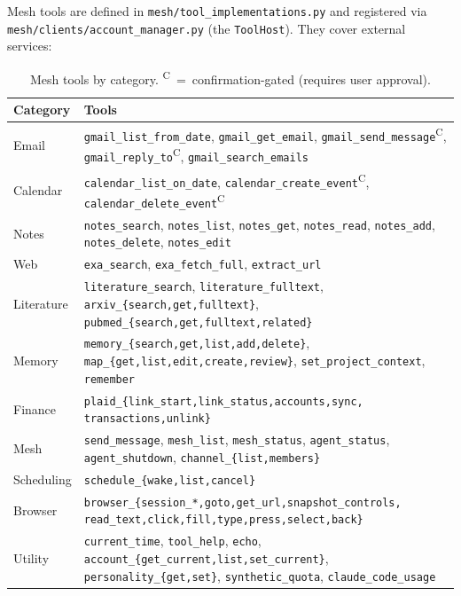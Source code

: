 \documentclass[11pt,a4paper]{article}
\newcommand{\code}[1]{\texttt{#1}}
\begin{document}
Mesh tools are defined in \code{mesh/tool\_implementations.py} and
registered via \code{mesh/clients/account\_manager.py} (the
\code{ToolHost}). They cover external services:

\begin{table}[h]
\centering
\small
\begin{tabular}{@{}lL{8cm}@{}}
\toprule
\textbf{Category} & \textbf{Tools} \\
\midrule
Email      & \code{gmail\_list\_from\_date}, \code{gmail\_get\_email},
             \code{gmail\_send\_message}\textsuperscript{C},
             \code{gmail\_reply\_to}\textsuperscript{C},
             \code{gmail\_search\_emails} \\
Calendar   & \code{calendar\_list\_on\_date},
             \code{calendar\_create\_event}\textsuperscript{C},
             \code{calendar\_delete\_event}\textsuperscript{C} \\
Notes      & \code{notes\_search}, \code{notes\_list}, \code{notes\_get},
             \code{notes\_read}, \code{notes\_add}, \code{notes\_delete},
             \code{notes\_edit} \\
Web        & \code{exa\_search}, \code{exa\_fetch\_full},
             \code{extract\_url} \\
Literature & \code{literature\_search}, \code{literature\_fulltext},
             \code{arxiv\_\{search,get,fulltext\}},
             \code{pubmed\_\{search,get,fulltext,related\}} \\
Memory     & \code{memory\_\{search,get,list,add,delete\}},
             \code{map\_\{get,list,edit,create,review\}},
             \code{set\_project\_context},
             \code{remember} \\
Finance    & \code{plaid\_\{link\_start,link\_status,accounts,sync,
             transactions,unlink\}} \\
Mesh       & \code{send\_message}, \code{mesh\_list}, \code{mesh\_status},
             \code{agent\_status}, \code{agent\_shutdown},
             \code{channel\_\{list,members\}} \\
Scheduling & \code{schedule\_\{wake,list,cancel\}} \\
Browser    & \code{browser\_\{session\_*,goto,get\_url,snapshot\_controls,
             read\_text,click,fill,type,press,select,back\}} \\
Utility    & \code{current\_time}, \code{tool\_help}, \code{echo},
             \code{account\_\{get\_current,list,set\_current\}},
             \code{personality\_\{get,set\}},
             \code{synthetic\_quota}, \code{claude\_code\_usage} \\
\bottomrule
\end{tabular}
\caption{Mesh tools by category.
  \textsuperscript{C}~=~confirmation-gated (requires user approval).}
\label{tab:mesh-tools}
\end{table}
\end{document}
